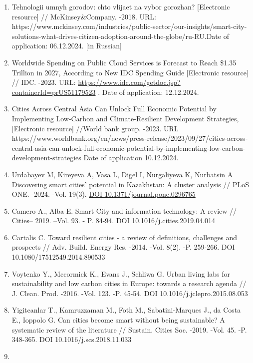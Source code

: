 {\begin{enumerate}
\def\labelenumi{\arabic{enumi}.}
\item
  Tehnologii umnyh gorodov: chto vlijaet na vybor gorozhan?
  {[}Electronic resource{]} // McKinsey\&Company. -2018. URL:
  https://www.mckinsey.com/industries/public-sector/our-insights/smart-city-solutions-what-drives-citizen-adoption-around-the-globe/ru-RU.Date
  of application: 06.12.2024. {[}in Russian{]}
\item
  Worldwide Spending on Public Cloud Services is Forecast to Reach
  \$1.35 Trillion in 2027, According to New IDC Spending Guide
  {[}Electronic resource{]} // IDC. -2023. URL:
  \url{https://www.idc.com/getdoc.jsp?containerId=prUS51179523} . Date
  of application: 12.12.2024.
\item
  Cities Across Central Asia Can Unlock Full Economic Potential by
  Implementing Low-Carbon and Climate-Resilient Development Strategies,
  {[}Electronic resource{]} //World bank group. -2023. URL
  https://www.worldbank.org/en/news/press-release/2023/09/27/cities-across-central-asia-can-unlock-full-economic-potential-by-implementing-low-carbon-development-strategies
  Date of application 10.12.2024.
\item
  Urdabayev M, Kireyeva A, Vasa L, Digel I, Nurgaliyeva K, Nurbatsin A
  Discovering smart cities' potential in Kazakhstan: A cluster analysis
  // PLoS ONE. -2024. -Vol. 19(3).
  \href{https://doi.org/10.1371/journal.pone.0296765}{DOI
  10.1371/journal.pone.0296765}
\item
  Camero A., Alba E. Smart City and information technology: A review //
  Cities-- 2019. --Vol. 93. - P. 84-94. DOI 10.1016/j.cities.2019.04.014
\item
  Cartalis C. Toward resilient cities - a review of definitions,
  challenges and prospects // Adv. Build. Energy Res. -2014. -Vol. 8(2).
  -P. 259-266. DOI 10.1080/17512549.2014.890533
\item
  Voytenko Y., Mccormick K., Evans J., Schliwa G. Urban living labs for
  sustainability and low carbon cities in Europe: towards a research
  agenda // J. Clean. Prod. -2016. -Vol. 123. -P. 45-54. DOI
  10.1016/j.jclepro.2015.08.053
\item
  Yigitcanlar T., Kamruzzaman M., Foth M., Sabatini-Marques J., da Costa
  E., Ioppolo G. Can cities become smart without being sustainable? A
  systematic review of the literature // Sustain. Cities Soc. -2019.
  -Vol. 45. -P. 348-365. DOI 10.1016/j.scs.2018.11.033
\item

\end{enumerate}}
